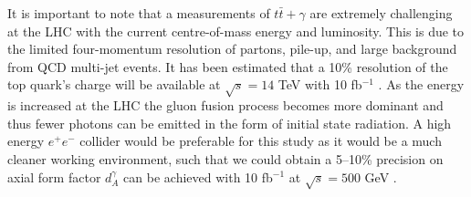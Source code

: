 It is important to note that a measurements of $t\bar{t}+\gamma$ are extremely challenging at the LHC with the current centre-of-mass energy 
and luminosity. This is due to the limited four-momentum resolution of partons, pile-up, and large background from QCD multi-jet events. It has 
been estimated that a 10\% resolution of the top quark's charge will be available at $\sqrt{s} = 14$ TeV with 10 fb$^{-1}$ \cite{
topchargemeasurement}. As the energy is increased at the LHC the gluon fusion process becomes more dominant and thus fewer photons can be 
emitted in the form of initial state radiation. A high energy $e^+e^-$ collider would be preferable for this study as it would be a much 
cleaner working environment, such that we could obtain a 5--10\% precision on axial form factor $d^{\gamma}_A$ can be achieved with 10 fb$^{-1}$
at $\sqrt{s} = 500$ GeV \cite{linearcollider}.
